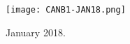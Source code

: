 \documentclass[fleqn,usenatbib]{rasti}
\begin{document}
\begin{figure}[H]
  \centering
  \texttt{[image: CANB1-JAN18.png]}
  \caption{January 2018.}
  \label{fig:jan18}
\end{figure}


\appendix









\end{document}
